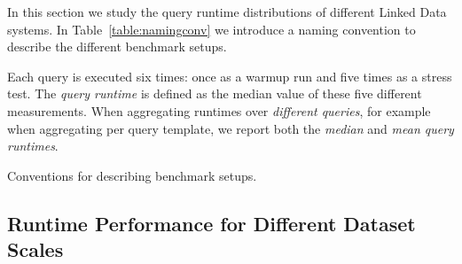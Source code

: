 In this section we study the query runtime distributions of different Linked Data systems. 
In Table~\ref{table:namingconv} we introduce a naming convention to describe the different benchmark setups. 

Each query is executed six times: once as a warmup run and five times as a stress test. The \emph{query runtime} is defined as the median value of these five different measurements.
When aggregating runtimes over \emph{different queries}, for example when aggregating per query template, we report both the \emph{median} and \emph{mean query runtimes}. 




\begin{table}[ht!]
	\centering
	\caption{Conventions for describing benchmark setups.}
	\label{table:namingconv}
	 \caption*{A description consists of a 3-character prefix describing the RDF storage solution, the number of nodes, the amount of memory and the configuration.}
\end{table}




\subsection{Runtime Performance for Different Dataset Scales}
\label{subsec:bigdata}



